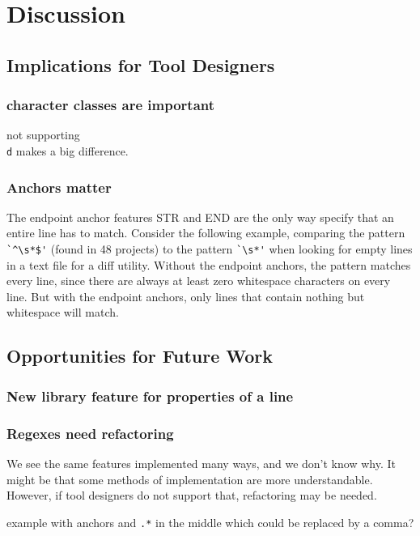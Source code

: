 \section{Discussion}
\label{sec:discussion}

\subsection{Implications for Tool Designers}

\subsubsection{character classes are important}
not supporting {\tt \\d} makes a big difference.

\subsubsection{Anchors matter}
The endpoint anchor features STR and END are the only way specify that an entire line has to match.  Consider the following example, comparing the pattern \verb!`^\s*$'! (found in 48 projects) to the pattern \verb!`\s*'! when looking for empty lines in a text file for a diff utility.  Without the endpoint anchors, the pattern matches every line, since there are always at least zero whitespace characters on every line.  But with the endpoint anchors, only lines that contain nothing but whitespace will match.

\subsection{Opportunities for Future Work}

\subsubsection{New library feature for properties of a line}

\subsubsection{Regexes need refactoring}
We see the same features implemented many ways, and we don't know why. It might be that some methods of implementation are more understandable. However, if tool designers do not support that, refactoring may be needed.

example with anchors and {\tt .*} in the middle which could be replaced by a comma?

